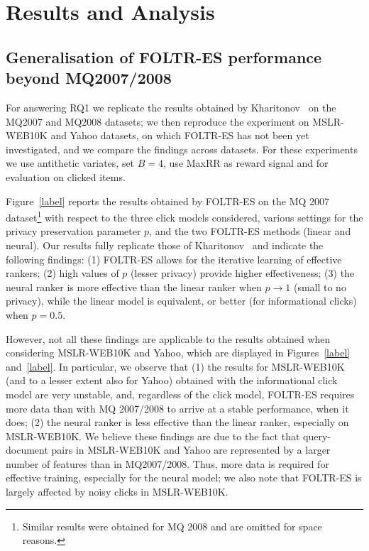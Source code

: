 \section{Results and Analysis}


\subsection{Generalisation of FOLTR-ES performance beyond MQ2007/2008}
For answering RQ1 we replicate the results obtained by Kharitonov~\cite{kharitonov2019federated} on the MQ2007 and MQ2008 datasets; we then reproduce the experiment on MSLR-WEB10K and Yahoo datasets, on which FOLTR-ES has not been yet investigated, and we compare the findings across datasets. For these experiments we use antithetic variates, set $B = 4$, use MaxRR as reward signal and for evaluation on clicked items. 

Figure~\ref{label} reports the results obtained by FOLTR-ES on the MQ 2007 dataset\footnote{Similar results were obtained for MQ 2008 and are omitted for space reasons.} with respect to the three click models considered, various settings for the privacy preservation parameter $p$, and the two FOLTR-ES methods (linear and neural). Our results fully replicate those of Kharitonov~\cite{kharitonov2019federated} and indicate the following findings: (1) FOLTR-ES allows for the iterative learning of effective rankers; (2) high values of $p$ (lesser privacy) provide higher effectiveness; 
(3) the neural ranker is more effective than the linear ranker when $p \rightarrow 1$ (small to no privacy), while the linear model is equivalent, or better (for informational clicks) when $p=0.5$. 


However, not all these findings are applicable to the results obtained when considering MSLR-WEB10K and Yahoo, which are displayed in Figures~\ref{label} and~\ref{label}. In particular, we observe that (1) the results for MSLR-WEB10K (and to a lesser extent also for Yahoo) obtained with the informational click model are very unstable, and, regardless of the click model, FOLTR-ES requires more data than with MQ 2007/2008 to arrive at a stable performance, when it does; (2) the neural ranker is less effective than the linear ranker, especially on MSLR-WEB10K. We believe these findings are due to the fact that query-document pairs in MSLR-WEB10K and Yahoo are represented by a larger number of features than in MQ2007/2008. Thus, more data is required for effective training, especially for the neural model; we also note that FOLTR-ES is largely affected by noisy clicks in MSLR-WEB10K. 

